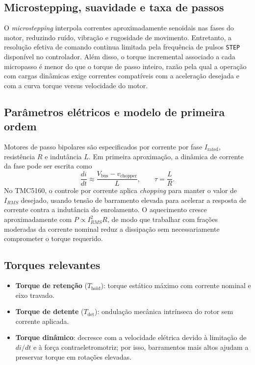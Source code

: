 \subsection{Microstepping, suavidade e taxa de passos}

O \emph{microstepping} interpola correntes aproximadamente senoidais nas
fases do motor, reduzindo ru\'ido, vibra\c{c}\~ao e rugosidade de
movimento. Entretanto, a resolu\c{c}\~ao efetiva de comando continua
limitada pela frequ\^encia de pulsos \texttt{STEP} dispon\'ivel no
controlador. Al\'em disso, o torque incremental associado a cada
micropasso \'e menor do que o torque de passo inteiro, raz\~ao pela qual a
opera\c{c}\~ao com cargas din\^amicas exige correntes compat\'iveis com a
acelera\c{c}\~ao desejada e com a curva torque versus velocidade do motor.

\subsection{Par\^ametros el\'etricos e modelo de primeira ordem}

Motores de passo bipolares s\~ao especificados por corrente por fase
$I_{\text{rated}}$, resist\^encia $R$ e indut\^ancia $L$. Em primeira
aproxima\c{c}\~ao, a din\^amica de corrente da fase pode ser escrita como
\begin{equation}
    \frac{di}{dt} \approx \frac{V_{\text{bus}} - v_{\text{chopper}}}{L},
    \qquad
    \tau = \frac{L}{R}.
\end{equation}
No TMC5160, o controle por corrente aplica \emph{chopping} para manter o
valor de $I_{RMS}$ desejado, usando tens\~ao de barramento elevada para
acelerar a resposta de corrente contra a indut\^ancia do enrolamento. O
aquecimento cresce aproximadamente com $P \propto I_{RMS}^2 R$, de modo
que trabalhar com fra\c{c}\~oes moderadas da corrente nominal reduz a
dissipa\c{c}\~ao sem necessariamente comprometer o torque requerido.

\subsection{Torques relevantes}

\begin{itemize}
\item \textbf{Torque de reten\c{c}\~ao} ($T_{\text{hold}}$): torque
  est\'atico m\'aximo com corrente nominal e eixo travado.
\item \textbf{Torque de detente} ($T_{\text{det}}$): ondula\c{c}\~ao
  mec\^anica intr\'inseca do rotor sem corrente aplicada.
\item \textbf{Torque din\^amico}: decresce com a velocidade el\'etrica
  devido \`a limita\c{c}\~ao de $di/dt$ e \`a for\c{c}a
  contraeletromotriz; por isso, barramentos mais altos ajudam a preservar
  torque em rota\c{c}\~oes elevadas.
\end{itemize}

